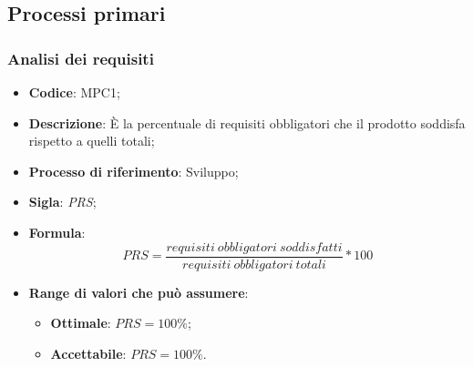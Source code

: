 \subsection{Processi primari}
\subsubsection{Analisi dei requisiti}
\vspace{-1cm}
\begin{itemize}
	\item \textbf{Codice}: MPC1;
	\item \textbf{Descrizione}: È la percentuale di requisiti obbligatori che il prodotto soddisfa rispetto a quelli totali;
	\item \textbf{Processo di riferimento}: Sviluppo;
	\item \textbf{Sigla}: \textit{PRS};
	\item \textbf{Formula}: \[ PRS = \frac{requisiti \ obbligatori \ soddisfatti}{requisiti \ obbligatori \ totali} \ast 100 \]
	\item \textbf{Range di valori che può assumere}:
		\begin{itemize}
			\item \textbf{Ottimale}: $PRS = 100 \%$;
			\item \textbf{Accettabile}: $PRS = 100 \%$.
		\end{itemize}
\end{itemize}